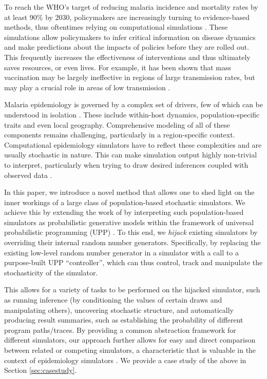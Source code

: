 \documentclass{article}
\begin{document}
To reach the WHO's target of reducing malaria incidence and mortality rates by at least 90\% by 2030, policymakers are increasingly turning to evidence-based methods, thus oftentimes relying on computational simulations \cite{who_global_2015}. 
These simulations allow policymakers to infer critical information on disease dynamics and make predictions about the impacts of policies
before they are rolled out. This frequently increases the effectiveness of interventions and thus ultimately saves resources, or even lives.
For example, it has been shown that mass vaccination may be largely ineffective in regions of large transmission rates, but may play a crucial role in areas of low transmission \cite{cameron2015defining}. 

Malaria epidemiology is governed by a complex set of drivers, 
few of which can be understood in isolation \cite{cameron2015defining,autino_epidemiology_2012,smith2008towards,bershteyn2018implementation}.
These include within-host dynamics, population-specific traits and even local geography.
Comprehensive modeling of all of these components remains challenging, particularly in a region-specific context. 
Computational epidemiology simulators have to reflect these complexities and are usually stochastic in nature. This can make simulation output highly non-trivial to interpret, particularly when trying to draw desired inferences coupled with observed data \cite{mwendera_challenges_2019,ferris_openmalaria_2015}.


In this paper, we introduce a novel method that allows one to shed light on the inner workings of a large class of population-based stochastic simulators. We achieve this by extending the work of \citet{baydin2018efficient} by interpreting such population-based simulators as probabilistic generative models within the framework of universal probabilistic programming (UPP) \cite{le-2016-inference}. To this end, we \emph{hijack} existing simulators by overriding their internal random number generators.  Specifically, by replacing the existing low-level random number generator in a simulator with a call to a purpose-built UPP ``controller'', which can thus control, track and manipulate the stochasticity of the simulator.

This allows for a variety of tasks to be performed on
the hijacked simulator, such as running inference (by conditioning
the values of certain draws and manipulating others),
uncovering stochastic structure, and automatically
producing result summaries, such as establishing the probability
of different program paths/traces.  By providing a common abstraction 
framework for different simulators, our approach further allows for
easy and direct comparison between related or competing
simulators, a characteristic that is valuable in the context of
epidemiology simulators \cite{ferris_openmalaria_2015}. We provide a case study of the above in Section \ref{sec:casestudy}.
\end{document}
